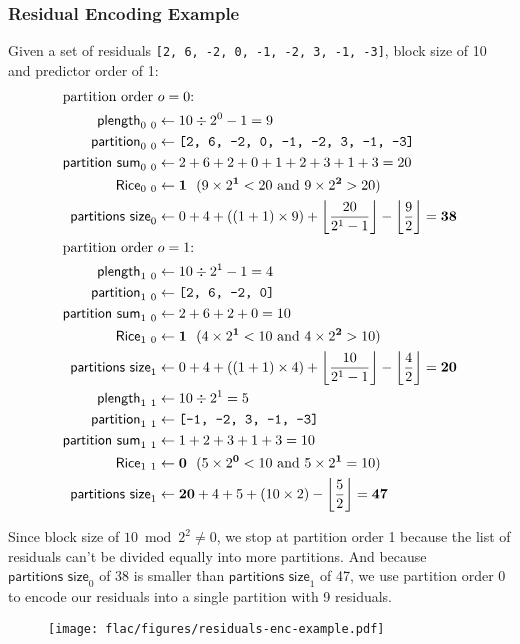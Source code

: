 \clearpage

\subsubsection{Residual Encoding Example}
Given a set of residuals \texttt{[2, 6, -2, 0, -1, -2, 3, -1, -3]},
block size of 10 and predictor order of 1:
{
  \begin{align*}
  \intertext{$\text{partition order}~o = 0$:}
  \textsf{plength}_{0~0} &\leftarrow 10 \div 2 ^ 0 - 1 = 9 \\
  \textsf{partition}_{0~0} &\leftarrow \texttt{[2, 6, -2, 0, -1, -2, 3, -1, -3]} \\
  \textsf{partition sum}_{0~0} &\leftarrow 2 + 6 + 2 + 0 + 1 + 2 + 3 + 1 + 3 = 20 \\
  \textsf{Rice}_{0~0} &\leftarrow \textbf{1}~~(9 \times 2 ^ \textbf{1} < 20 \text{ and } 9 \times 2 ^ \textbf{2} > 20) \\
  \textsf{partitions size}_0 &\leftarrow 0 + 4 + ((1 + 1) \times 9) + \left\lfloor\frac{20}{2 ^ 1 - 1}\right\rfloor - \left\lfloor\frac{9}{2}\right\rfloor = \textbf{38} \\
  \intertext{$\text{partition order}~o = 1$:}
  \textsf{plength}_{1~0} &\leftarrow 10 \div 2 ^ 1 - 1 = 4 \\
  \textsf{partition}_{1~0} &\leftarrow \texttt{[2, 6, -2, 0]} \\
  \textsf{partition sum}_{1~0} &\leftarrow 2 + 6 + 2 + 0 = 10 \\
  \textsf{Rice}_{1~0} &\leftarrow \textbf{1}~~(4 \times 2 ^ \textbf{1} < 10 \text{ and } 4 \times 2 ^ \textbf{2} > 10) \\
  \textsf{partitions size}_1 &\leftarrow 0 + 4 + ((1 + 1) \times 4) + \left\lfloor\frac{10}{2 ^ 1 - 1}\right\rfloor - \left\lfloor\frac{4}{2}\right\rfloor = \textbf{20} \\
  \textsf{plength}_{1~1} &\leftarrow 10 \div 2 ^ 1 = 5 \\
  \textsf{partition}_{1~1} &\leftarrow \texttt{[-1, -2, 3, -1, -3]} \\
  \textsf{partition sum}_{1~1} &\leftarrow 1 + 2 + 3 + 1 + 3 = 10 \\
  \textsf{Rice}_{1~1} &\leftarrow \textbf{0}~~(5 \times 2 ^ \textbf{0} < 10 \text{ and } 5 \times 2 ^ \textbf{1} = 10) \\
  \textsf{partitions size}_1 &\leftarrow \textbf{20} + 4 + 5 + (10 \times
  2) - \left\lfloor\frac{5}{2}\right\rfloor = \textbf{47}
\end{align*}}
\par
\noindent
Since block size of $10 \bmod 2 ^ 2 \neq 0$, we stop at partition order 1
because the list of residuals can't be divided equally into more partitions.
And because $\textsf{partitions size}_0$ of 38 is smaller than
$\textsf{partitions size}_1$ of 47, we use partition order 0
to encode our residuals into a single partition with 9 residuals.

\begin{figure}[h]
  \texttt{[image: flac/figures/residuals-enc-example.pdf]}
\end{figure}
